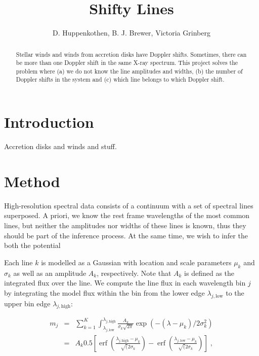 \documentclass[12pt]{emulateapj}
\newcommand{\mean}{m}
\DeclareMathOperator\erf{erf}
\begin{document}
\title{Shifty Lines}

\author{D. Huppenkothen, B. J. Brewer, Victoria Grinberg}
 


\begin{abstract}
Stellar winds and winds from accretion disks have Doppler shifts. Sometimes, there can be more than one Doppler shift in 
the same X-ray spectrum. This project solves the problem where (a) we do not know the line amplitudes and widths, (b) the 
number of Doppler shifts in the system and (c) which line belongs to which Doppler shift.

\end{abstract}


\section{Introduction}

Accretion disks and winds and stuff.

\section{Method}

High-resolution spectral data consists of a continuum with a set of spectral lines superposed. A priori, we know the rest frame wavelengths of the most common lines, but neither the amplitudes nor widths of these lines is known, thus they should be part of the inference process. At the same time, we wish to infer the both the potential 

Each line $k$ is modelled as a Gaussian with location and scale parameters $\mu_k$ and $\sigma_k$ as well as an amplitude $A_k$, respectively. Note that $A_k$ is defined as the integrated flux over the line. We compute the line flux in each wavelength bin $j$ by integrating the model flux within the bin from the lower edge $\lambda_{j, \mathrm{low}}$ to the upper bin edge $\lambda_{j, \mathrm{high}}$:

\begin{eqnarray}
\mean_j & = &  \sum_{k=1}^{K}{\int^{\lambda_{j,\mathrm{high}}}_{\lambda_{j, \mathrm{low}}}{\frac{A_k}{\sigma_k\sqrt{2\pi}} \exp{(-(\lambda-\mu_k)/{2\sigma_k^2})}}} \\ \nonumber
& = & A_k 0.5 \left[ \erf{\left( \frac{\lambda_{j,\mathrm{high}} - \mu_k}{\sqrt({2}\sigma_k}\right)} - \erf{\left( \frac{\lambda_{j, \mathrm{low}} - \mu_k}{\sqrt({2}\sigma_k}\right)} \right] \; ,
\end{eqnarray}
\end{document}
